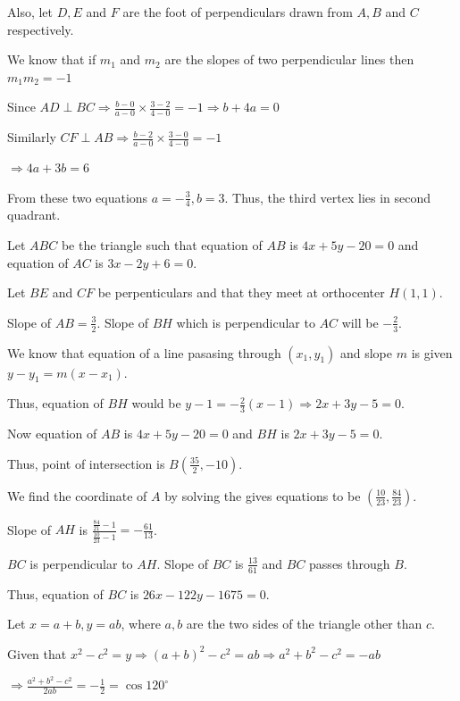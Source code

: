   Also, let $D, E$ and $F$ are the foot of perpendiculars drawn from $A, B$ and $C$ respectively.

  We know that if $m_1$ and $m_2$ are the slopes of two perpendicular lines then $m_1m_2 = -1$

  Since $AD\perp BC\Rightarrow \frac{b - 0}{a - 0}\times \frac{3 - 2}{4 - 0} = -1 \Rightarrow b + 4a = 0$

  Similarly $CF\perp AB\Rightarrow \frac{b - 2}{a - 0}\times\frac{3 - 0}{4 - 0} = -1$

  $\Rightarrow 4a + 3b = 6$

  From these two equations $a = -\frac{3}{4}, b = 3$. Thus, the third vertex lies in second quadrant.
\item Let $ABC$ be the triangle such that equation of $AB$ is $4x + 5y - 20 = 0$ and equation of $AC$ is $3x
  - 2y + 6 = 0$.

  Let $BE$ and $CF$ be perpenticulars and that they meet at orthocenter $H(1, 1)$.

  Slope of $AB = \frac{3}{2}$. Slope of $BH$ which is perpendicular to $AC$ will be $-\frac{2}{3}$.

  We know that equation of a line pasasing through $(x_1, y_1)$ and slope $m$ is given $y - y_1 = m(x -
  x_1)$.

  Thus, equation of $BH$ would be $y - 1 = -\frac{2}{3}(x - 1)\Rightarrow 2x + 3y - 5 = 0$.

  Now equation of $AB$ is $4x + 5y - 20 = 0$ and $BH$ is $2x + 3y - 5 = 0$.

  Thus, point of intersection is $B\left(\frac{35}{2}, -10\right)$.

  We find the coordinate of $A$ by solving the gives equations to be
  $\left(\frac{10}{23}, \frac{84}{23}\right)$.

  Slope of $AH$ is $\frac{\frac{84}{21} - 1}{\frac{10}{23} - 1} = -\frac{61}{13}$.

  $BC$ is perpendicular to $AH$. Slope of $BC$ is $\frac{13}{61}$ and $BC$ passes through $B$.

  Thus, equation of $BC$ is $26x - 122y - 1675 = 0$.
\item Let $x = a + b, y = ab$, where $a, b$ are the two sides of the triangle other than $c$.

  Given that $x^2 - c^2 = y \Rightarrow (a + b)^2 - c^2 = ab \Rightarrow a^2 + b^2 - c^2 = -ab$

  $\Rightarrow \frac{a^2 + b^2 - c^2}{2ab} = -\frac{1}{2} = \cos120^\circ$

